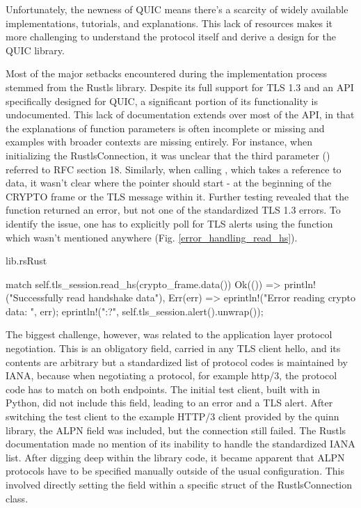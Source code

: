 Unfortunately, the newness of QUIC means there's a scarcity of widely available implementations, tutorials,
and explanations. This lack of resources makes it more challenging to understand the protocol itself and derive a design
for the QUIC library.

Most of the major setbacks encountered during the implementation process stemmed from the Rustls library. Despite its full support for 
TLS 1.3 and an API specifically designed for QUIC, a significant portion of its functionality is undocumented. This lack of documentation
extends over most of the API, in that the explanations of function parameters is often incomplete or missing and examples with
broader contexts are missing entirely.
For instance, when initializing the RustlsConnection, it was unclear that the third parameter () referred to
RFC section 18. Similarly, when calling , which takes a reference to data, it wasn't clear where the
pointer should start - at the beginning of the CRYPTO frame or the TLS message within it. Further testing revealed that
the function returned an error, but not one of the standardized TLS 1.3 errors. To identify the issue, one has to explicitly
poll for TLS alerts using the  function which wasn't mentioned anywhere (Fig. \ref{error_handling_read_hs}).

\begin{codeblock}{lib.rs}{Rust}
    \begin{rustcode}
        match self.tls_session.read_hs(crypto_frame.data()) {
            Ok(()) => println!("Successfully read handshake data"),
            Err(err) => {
                eprintln!("Error reading crypto data: {}", err);
                eprintln!("{:?}", self.tls_session.alert().unwrap());
            }
        }
    \end{rustcode}
    \label{error_handling_read_hs}
\end{codeblock}

The biggest challenge, however, was related to the application layer protocol negotiation. This is an obligatory field, carried
in any TLS client hello, and its contents are arbitrary but a standardized list of protocol codes is maintained by IANA, because
when negotiating a protocol, for example http/3, the protocol code has to match on both endpoints. The initial test client, built
with  in Python, did not include this field, leading to an error and a TLS alert. After switching the test
client to the example HTTP/3 client provided by the quinn library, the ALPN field was included, but the connection still failed.
The Rustls documentation made no mention of its inability to handle the standardized IANA list. After digging deep
within the library code, it became apparent that ALPN protocols have to be specified manually outside of the usual configuration.
This involved directly setting the field within a specific struct of the RustlsConnection class. 

